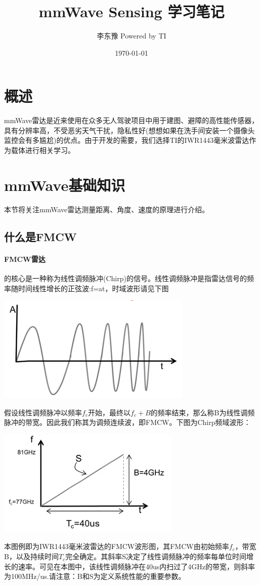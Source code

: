 \documentclass[UTF8]{ctexart}
\title{mmWave Sensing 学习笔记}
\author{李东豫  Powered by TI}
\date{\today}
\begin{document}
\maketitle
\tableofcontents
\section{概述}
mmWave雷达是近来使用在众多无人驾驶项目中用于建图、避障的高性能传感器，具有分辨率高，不受恶劣天气干扰，隐私性好(想想如果在洗手间安装一个摄像头监控会有多尴尬)的优点。由于开发的需要，我们选择TI的IWR1443毫米波雷达作为载体进行相关学习。
\section{mmWave基础知识}
本节将关注mmWave雷达测量距离、角度、速度的原理进行介绍。
\subsection{什么是FMCW}
\paragraph{FMCW雷达}
的核心是一种称为线性调频脉冲(Chirp)的信号。线性调频脉冲是指雷达信号的频率随时间线性增长的正弦波:f=at，时域波形请见下图\\
{\centering \includegraphics[width = .4\textwidth]{pic/FMCW.png}

}

假设线性调频脉冲以频率$f_c$开始，最终以$f_c+B$的频率结束，那么称B为线性调频脉冲的带宽。因此我们称其为调频连续波，即FMCW。下图为Chirp频域波形：

{\centering \includegraphics[width = .4\textwidth]{pic/FMCW_Fwave.png}

}

本图例即为IWR1443毫米波雷达的FMCW波形图，其FMCW由初始频率$f_c$，带宽B，以及持续时间$T_c$完全确定。其斜率S决定了线性调频脉冲的频率每单位时间增长的速率。可见在本图中，该线性调频脉冲在40us内扫过了4GHz的带宽，则斜率为100MHz/us.请注意：B和S为定义系统性能的重要参数。
\end{document}
